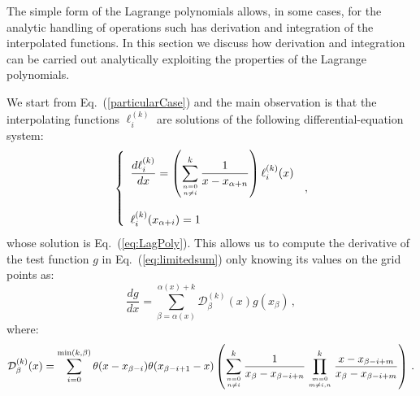 \documentclass[10pt,a4paper]{article}
\begin{document}
The simple form of the Lagrange polynomials allows, in some cases, for
the analytic handling of operations such has derivation and
integration of the interpolated functions. In this section we discuss
how derivation and integration can be carried out analytically
exploiting the properties of the Lagrange polynomials.

We start from Eq.~(\ref{particularCase}) and the main observation is
that the interpolating functions $\ell_i^{(k)}$ are solutions of the
following differential-equation system:
\begin{equation}\label{eq:diffeqlagpol}
\left\{
\begin{array}{l}
\displaystyle \frac{d\ell_i^{(k)}}{dx} = \left(\sum_{n=0 \atop n\neq
  i}^k\frac{1}{x-x_{\alpha+n}}\right) \ell_i^{(k)}(x)\\
\\
\ell_i^{(k)}(x_{\alpha+i}) = 1
\end{array}
\right.\,,
\end{equation}
whose solution is Eq.~(\ref{eq:LagPoly}). This allows us to compute the
derivative of the test function $g$ in Eq.~(\ref{eq:limitedsum}) only
knowing its values on the grid points as: 
\begin{equation}\label{DerGeneralCase2}
  \frac{dg}{dx} =
  \sum_{\beta=\alpha(x)}^{\alpha(x)+k}\mathcal{D}_\beta^{(k)}(x) g(x_{\beta})\,,
\end{equation}
where:
\begin{equation}\label{eq:derintfunc}
  \mathcal{D}_\beta^{(k)}(x) = \sum_{i=0}^{{\rm min}(k,\beta)}
  \theta(x-x_{\beta-i})\theta(x_{\beta-i+1}-x) \left(\sum_{n=0 \atop n\neq
  i}^k\frac1{x_\beta-x_{\beta-i+n}}\prod^{k}_{m=0\atop m\ne
    i,n}\frac{x-x_{\beta-i+m}}{x_{\beta}-x_{\beta-i+m}}\right)\,.
\end{equation}
\end{document}
